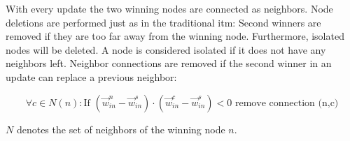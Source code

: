 With every update the two winning nodes are connected as neighbors. Node deletions are performed just as in the traditional \gls{itm}: Second winners are removed if they are too far away from the winning node. Furthermore, isolated nodes will be deleted. A node is considered isolated if it does not have any neighbors left. Neighbor connections are removed if the second winner in an update can replace a previous neighbor:

\begin{equation}
\forall c \in N(n): \text{If~} (\vec{w}^n_{in}-\vec{w}^s_{in}) \cdot (\vec{w}^c_{in}-\vec{w}^s_{in}) < 0 \text{~remove connection (n,c)}
\end{equation}

$N$ denotes the set of neighbors of the winning node $n$.

